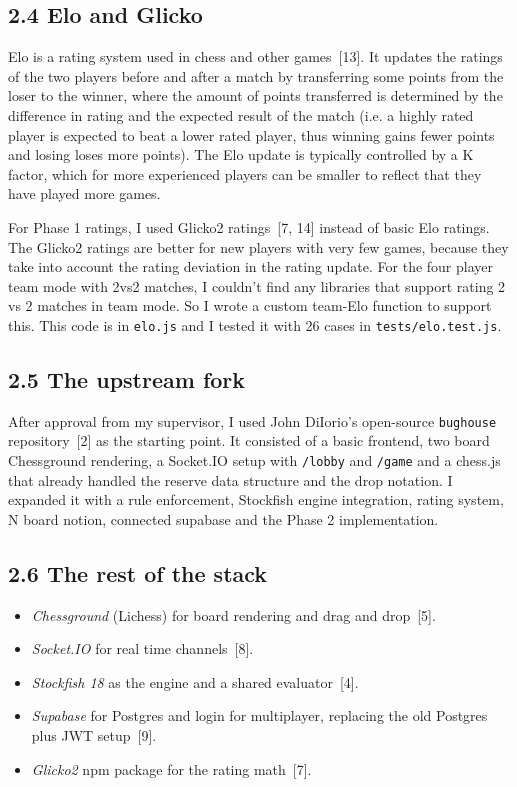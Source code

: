 \documentclass[11pt,a4paper]{article}
\begin{document}
\subsection*{2.4 Elo and Glicko}
Elo is a rating system used in chess and other games~[13]. It updates the ratings of the two players before and after a match by transferring some points from the loser to the winner, where the amount of points transferred is determined by the difference in rating and the expected result of the match (i.e. a highly rated player is expected to beat a lower rated player, thus winning gains fewer points and losing loses more points). The Elo update is typically controlled by a K factor, which for more experienced players can be smaller to reflect that they have played more games.

 For Phase 1 ratings, I used Glicko2 ratings~[7, 14] instead of basic Elo ratings. The Glicko2 ratings are better for new players with very few games, because they take into account the rating deviation in the rating update. For the four player team mode with 2vs2 matches, I couldn’t find any libraries that support rating 2 vs 2 matches in team mode. So I wrote a custom team-Elo function to support this. This code is in \texttt{elo.js} and I tested it with 26 cases in \texttt{tests/elo.test.js}.

\subsection*{2.5 The upstream fork}
After approval from my supervisor, I used John DiIorio's open-source \texttt{bughouse} repository~[2] as the starting point. It consisted of a basic frontend, two board Chessground rendering, a Socket.IO setup with \texttt{/lobby} and \texttt{/game} and a chess.js that already handled the reserve data structure and the drop notation. I expanded it with a rule enforcement, Stockfish engine integration, rating system, N board notion, connected supabase and the Phase 2 implementation.

\subsection*{2.6 The rest of the stack}
\begin{itemize}[leftmargin=*]
\item \textit{Chessground }(Lichess) for board rendering and drag and drop~[5].
\item \textit{Socket.IO} for real time channels~[8].
\item \textit{Stockfish 18} as the engine and a shared evaluator~[4].
\item \textit{Supabase} for Postgres and login for multiplayer, replacing the old Postgres plus JWT setup~[9].
\item \textit{Glicko2} npm package for the rating math~[7].
\end{itemize}
\newpage
\end{document}
